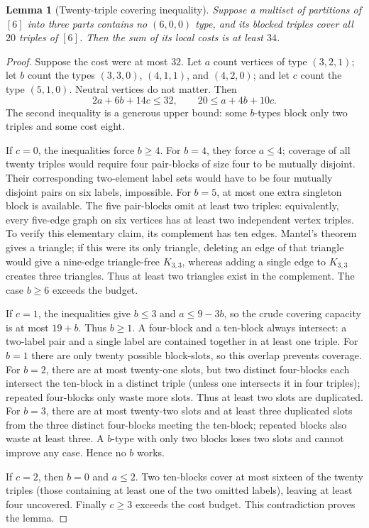 \documentclass[11pt]{article}
\newtheorem{lemma}[theorem]{Lemma}
\begin{document}
\begin{lemma}[Twenty-triple covering inequality]\label{lem:cover}
Suppose a multiset of partitions of $[6]$ into three parts contains no $(6,0,0)$ type, and its blocked triples cover all $20$ triples of $[6]$. Then the sum of its local costs is at least $34$.
\end{lemma}
\begin{proof}
Suppose the cost were at most $32$. Let $a$ count vertices of type $(3,2,1)$; let $b$ count the types $(3,3,0)$, $(4,1,1)$, and $(4,2,0)$; and let $c$ count the type $(5,1,0)$. Neutral vertices do not matter. Then
\begin{equation}\label{eq:budgets}
2a+6b+14c\le32,\qquad 20\le a+4b+10c.
\end{equation}
The second inequality is a generous upper bound: some $b$-types block only two triples and some cost eight.

If $c=0$, the inequalities force $b\ge4$. For $b=4$, they force $a\le4$; coverage of all twenty triples would require four pair-blocks of size four to be mutually disjoint. Their corresponding two-element label sets would have to be four mutually disjoint pairs on six labels, impossible. For $b=5$, at most one extra singleton block is available. The five pair-blocks omit at least two triples: equivalently, every five-edge graph on six vertices has at least two independent vertex triples. To verify this elementary claim, its complement has ten edges. Mantel's theorem gives a triangle; if this were its only triangle, deleting an edge of that triangle would give a nine-edge triangle-free $K_{3,3}$, whereas adding a single edge to $K_{3,3}$ creates three triangles. Thus at least two triangles exist in the complement. The case $b\ge6$ exceeds the budget.

If $c=1$, the inequalities give $b\le3$ and $a\le9-3b$, so the crude covering capacity is at most $19+b$. Thus $b\ge1$. A four-block and a ten-block always intersect: a two-label pair and a single label are contained together in at least one triple. For $b=1$ there are only twenty possible block-slots, so this overlap prevents coverage. For $b=2$, there are at most twenty-one slots, but two distinct four-blocks each intersect the ten-block in a distinct triple (unless one intersects it in four triples); repeated four-blocks only waste more slots. Thus at least two slots are duplicated. For $b=3$, there are at most twenty-two slots and at least three duplicated slots from the three distinct four-blocks meeting the ten-block; repeated blocks also waste at least three. A $b$-type with only two blocks loses two slots and cannot improve any case. Hence no $b$ works.

If $c=2$, then $b=0$ and $a\le2$. Two ten-blocks cover at most sixteen of the twenty triples (those containing at least one of the two omitted labels), leaving at least four uncovered. Finally $c\ge3$ exceeds the cost budget. This contradiction proves the lemma.
\end{proof}
\end{document}

